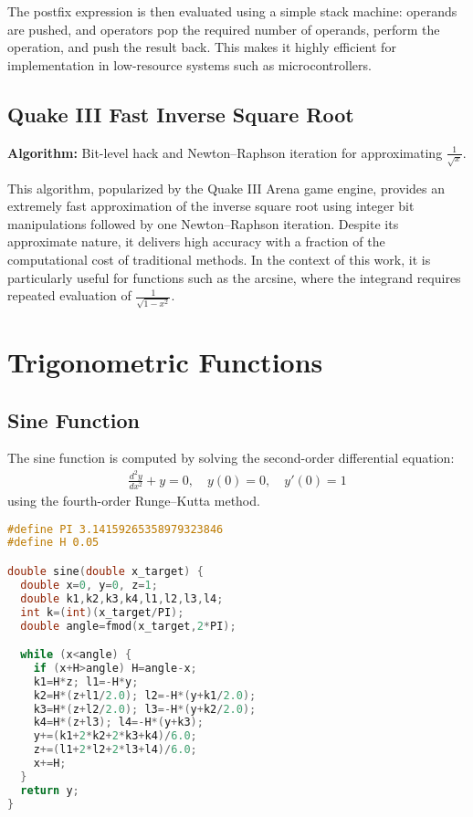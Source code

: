 \documentclass[conference]{IEEEtran}
\begin{document}
The postfix expression is then evaluated using a simple stack machine: operands are pushed, and operators pop the required number of operands, perform the operation, and push the result back. This makes it highly efficient for implementation in low-resource systems such as microcontrollers.

\subsection{Quake III Fast Inverse Square Root}
\textbf{Algorithm:} Bit-level hack and Newton--Raphson iteration for approximating \( \tfrac{1}{\sqrt{x}} \).  

This algorithm, popularized by the Quake III Arena game engine, provides an extremely fast 
approximation of the inverse square root using integer bit manipulations followed by one 
Newton--Raphson iteration. Despite its approximate nature, it delivers high accuracy with a 
fraction of the computational cost of traditional methods. In the context of this work, it is 
particularly useful for functions such as the arcsine, where the integrand requires repeated 
evaluation of \( \tfrac{1}{\sqrt{1-x^2}} \).

\section{Trigonometric Functions}

\subsection{Sine Function}
The sine function is computed by solving the second-order differential equation:
\begin{align}
\frac{d^2y}{dx^2} + y = 0, \quad y(0)=0, \quad y'(0)=1
\end{align}
using the fourth-order Runge--Kutta method.

\begin{lstlisting}[language=C, caption={C Implementation of Sine Function}]
#define PI 3.14159265358979323846
#define H 0.05

double sine(double x_target) {
  double x=0, y=0, z=1;
  double k1,k2,k3,k4,l1,l2,l3,l4;
  int k=(int)(x_target/PI);
  double angle=fmod(x_target,2*PI);

  while (x<angle) {
    if (x+H>angle) H=angle-x;
    k1=H*z; l1=-H*y;
    k2=H*(z+l1/2.0); l2=-H*(y+k1/2.0);
    k3=H*(z+l2/2.0); l3=-H*(y+k2/2.0);
    k4=H*(z+l3); l4=-H*(y+k3);
    y+=(k1+2*k2+2*k3+k4)/6.0;
    z+=(l1+2*l2+2*l3+l4)/6.0;
    x+=H;
  }
  return y;
}
\end{lstlisting}
\end{document}
